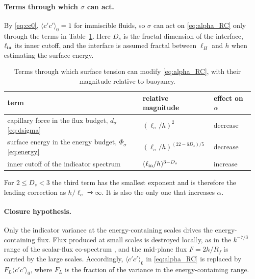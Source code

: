 \documentclass[11pt]{article}
\numberwithin{equation}{section}
\newcommand{\avg}[1]{\langle #1\rangle}
\newcommand{\ls}{\ell_\sigma}
\newcommand{\hd}{\dot h}
\begin{document}
\paragraph{Terms through which $\sigma$ can act.} By \eqref{eq:cc0}, $\avg{c' c'}_0 = 1$ for immiscible fluids, so $\sigma$ can act on \eqref{eq:alpha_RC} only through the terms in Table~\ref{tab:terms}. Here $D_s$ is the fractal dimension of the interface, $\ell_{\rm in}$ its inner cutoff, and the interface is assumed fractal between $\ell_H$ and $h$ when estimating the surface energy.
\begin{table}[h!]
\centering
\caption{Terms through which surface tension can modify \eqref{eq:alpha_RC}, with their magnitude relative to buoyancy.}
\label{tab:terms}
\begin{tabular}{lll}
\toprule
term & relative magnitude & effect on $\alpha$\\
\midrule
capillary force in the flux budget, $d_\sigma$ \eqref{eq:dsigma} & $(\ls/h)^2$ & decrease\\
surface energy in the energy budget, $\Phi_\sigma$ \eqref{eq:energy} & $(\ls/h)^{(22 - 6 D_s)/5}$ & decrease\\
inner cutoff of the indicator spectrum & $(\ell_{\rm in}/h)^{3 - D_s}$ & increase\\
\bottomrule
\end{tabular}
\end{table}
For $2 \le D_s < 3$ the third term has the smallest exponent and is therefore the leading correction as $h/\ls \rightarrowtriangle \infty$. It is also the only one that increases $\alpha$.

\paragraph{Closure hypothesis.} Only the indicator variance at the energy-containing scales drives the energy-containing flux. Flux produced at small scales is destroyed locally, as in the $k^{-7/3}$ range of the scalar-flux co-spectrum \cite{Lumley1967}, and the mid-plane flux $F = 2 \hd/R_f$ is carried by the large scales. Accordingly, $\avg{c' c'}_0$ in \eqref{eq:alpha_RC} is replaced by $F_L \avg{c' c'}_0$, where $F_L$ is the fraction of the variance in the energy-containing range.
\end{document}
